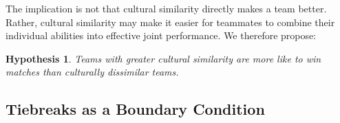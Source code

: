 \documentclass[10pt]{article}
\newtheorem{hypothesis}{Hypothesis}
\begin{document}
The implication is not that cultural similarity directly makes a team better. Rather, cultural similarity may make it easier for teammates to combine their individual abilities into effective joint performance. %
We therefore propose:
\begin{hypothesis}
 Teams with greater cultural similarity are more like to win matches  than culturally dissimilar teams.
\end{hypothesis}
\subsection{Tiebreaks as a Boundary Condition}

\end{document}
